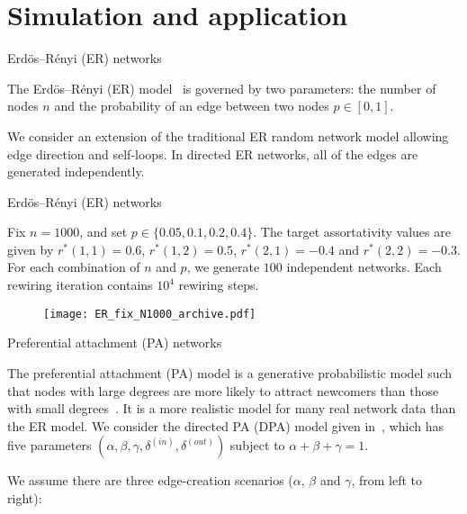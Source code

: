 \documentclass[xcolor=dvipsnames, compress, 10pt]{beamer}
\theoremstyle{remark}
\newcommand{\deltain}{\delta^{(in)}}
\newcommand{\deltaout}{\delta^{(out)}}
\begin{document}

\section{Simulation and application}


\begin{frame}{Erd\"{o}s--R\'{e}nyi (ER) networks}


The Erd\"{o}s--R\'{e}nyi (ER) model~\citep{Erdos1959on, Gilbert1959random} is
governed by two parameters: the number of nodes $n$ and the probability of an
edge between two nodes $p \in [0, 1]$. 

\vspace{0.2cm}

We consider an extension of the traditional ER random network model allowing
edge direction and self-loops. In directed ER networks, all of the edges are
generated independently.
	
\end{frame}


\begin{frame}{Erd\"{o}s--R\'{e}nyi (ER) networks}

Fix $n = 1000$, and set $p \in \{0.05, 0.1, 0.2, 0.4\}$. The target 
assortativity
values are given by $r^*(1, 1) = 0.6$, $r^*(1, 2) = 0.5$, 
$r^*(2, 1) = -0.4$ and $r^*(2, 2) = -0.3$. 
For each combination of $n$ and $p$, we
generate $100$ independent networks. Each rewiring iteration contains
$10^4$ rewiring steps.
\begin{figure}[tbp]
	\centering
	\texttt{[image: ER\_fix\_N1000\_archive.pdf]}
\end{figure}
	
\end{frame}


\begin{frame}{Preferential attachment (PA) networks}

The preferential attachment (PA) model is a generative probabilistic model such
that nodes with large degrees are more likely to attract newcomers than those
with small degrees~\citep[e.g.,][]{Barabasi1999emergence, Krapivsky2001degree,
Krapivsky2001organization}. It is a more realistic model for many real network
data than the ER model. We consider the directed PA (DPA) model given
in~\cite{Bollobas2003proceedings}, which has five parameters $(\alpha, \beta,
\gamma, \deltain, \deltaout)$ subject to $\alpha + \beta + \gamma = 1$.

\vspace{0.2cm}

We assume there are three edge-creation scenarios ($\alpha$, $\beta$ and
$\gamma$, from left to	right):
	
\begin{figure}
	\centering
	
\end{figure}

\end{frame}
\end{document}
